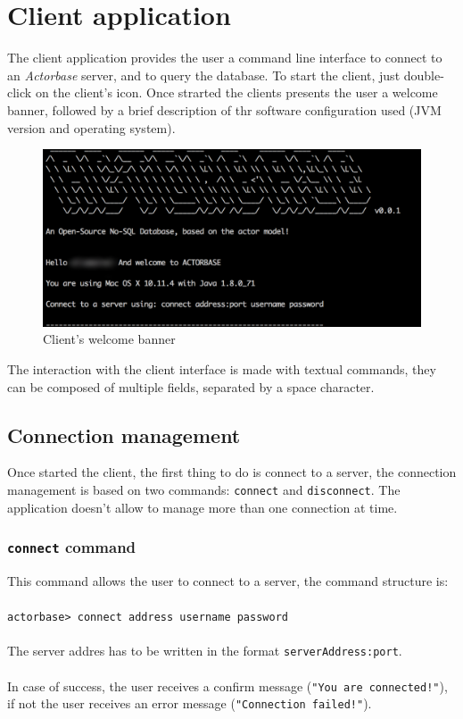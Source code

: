 \documentclass[a4paper]{article}
\begin{document}
	\section{Client application}
	The client application provides the user a command line interface to connect to an \emph{Actorbase} server, and to query the database. To start the client, just double-click on the client's icon. Once strarted the clients presents the user a welcome banner, followed by a brief description of thr software configuration used (JVM version and operating system).
	\begin{figure}[H]
		\centering
		\includegraphics[width=\textwidth]{welcomeClient.png}
		\caption{Client's welcome banner}
	\end{figure}
	The interaction with the client interface is made with textual commands, they can be composed of multiple fields, separated by a space character.
	
	\subsection{Connection management}
	Once started the client, the first thing to do is connect to a server, the connection management is based on two commands: \texttt{connect} and \texttt{disconnect}. The application doesn't allow to manage more than one connection at time.
	
	\subsubsection{\texttt{connect} command}
	This command allows the user to connect to a server, the command structure is:
	\\ \\
	\texttt{actorbase>	connect address username password}
	\\ \\
	The server addres has to be written in the format \texttt{serverAddress:port}. \\ \\
	In case of success, the user receives a confirm message (\texttt{"You are connected!"}), if not the user receives an error message (\texttt{"Connection failed!"}).
	
\end{document}

